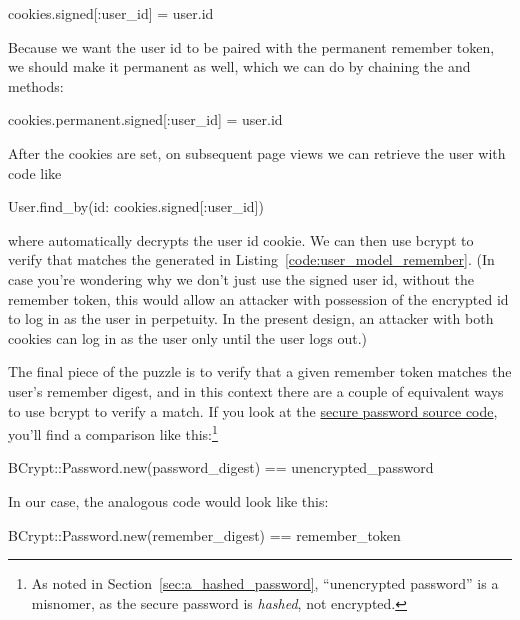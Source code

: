 \begin{code}
cookies.signed[:user_id] = user.id
\end{code}

\noindent Because we want the user id to be paired with the permanent remember token, we should make it permanent as well, which we can do by chaining the  and  methods:

\begin{code}
cookies.permanent.signed[:user_id] = user.id
\end{code}

After the cookies are set, on subsequent page views we can retrieve the user with code like

\begin{code}
User.find_by(id: cookies.signed[:user_id])
\end{code}

\noindent where  automatically decrypts the user id \linebreak cookie. We can then use bcrypt to verify that  matches the  generated in Listing~\ref{code:user_model_remember}. (In case you're wondering why we don't just use the signed user id, without the remember token, this would allow an attacker with possession of the encrypted id to log in as the user in perpetuity. In the present design, an attacker with both cookies can log in as the user only until the user logs out.)

The final piece of the puzzle is to verify that a given remember token matches the user's remember digest, and in this context there are a couple of equivalent ways to use bcrypt to verify a match. If you look at the \href{https://github.com/rails/rails/blob/master/activemodel/lib/active_model/secure_password.rb}{secure password source code}, you'll find a comparison like this:\footnote{As noted in Section~\ref{sec:a_hashed_password}, ``unencrypted password'' is a misnomer, as the secure password is \emph{hashed}, not encrypted.}

\begin{code}
BCrypt::Password.new(password_digest) == unencrypted_password
\end{code}

\noindent In our case, the analogous code would look like this:

\begin{code}
BCrypt::Password.new(remember_digest) == remember_token
\end{code}

